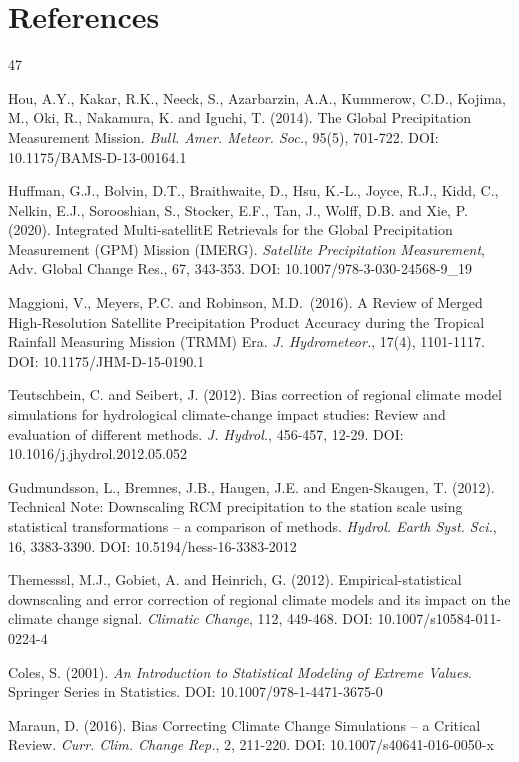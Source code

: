 \documentclass[
]{article}
\begin{document}
\section*{References}
\begin{thebibliography}{47}

 Hou, A.Y., Kakar, R.K., Neeck, S., Azarbarzin, A.A., Kummerow,
C.D., Kojima, M., Oki, R., Nakamura, K. and Iguchi, T. (2014). The
Global Precipitation Measurement Mission. \emph{Bull. Amer. Meteor.
Soc.}, 95(5), 701-722. DOI: 10.1175/BAMS-D-13-00164.1

 Huffman, G.J., Bolvin, D.T., Braithwaite, D., Hsu, K.-L., Joyce,
R.J., Kidd, C., Nelkin, E.J., Sorooshian, S., Stocker, E.F., Tan, J.,
Wolff, D.B. and Xie, P. (2020). Integrated Multi-satellitE Retrievals
for the Global Precipitation Measurement (GPM) Mission (IMERG).
\emph{Satellite Precipitation Measurement}, Adv. Global Change Res., 67,
343-353. DOI: 10.1007/978-3-030-24568-9\_19

 Maggioni, V., Meyers, P.C. and Robinson, M.D.~(2016). A Review
of Merged High-Resolution Satellite Precipitation Product Accuracy
during the Tropical Rainfall Measuring Mission (TRMM) Era. \emph{J.
Hydrometeor.}, 17(4), 1101-1117. DOI: 10.1175/JHM-D-15-0190.1

 Teutschbein, C. and Seibert, J. (2012). Bias correction of
regional climate model simulations for hydrological climate-change
impact studies: Review and evaluation of different methods. \emph{J.
Hydrol.}, 456-457, 12-29. DOI: 10.1016/j.jhydrol.2012.05.052

 Gudmundsson, L., Bremnes, J.B., Haugen, J.E. and Engen-Skaugen,
T. (2012). Technical Note: Downscaling RCM precipitation to the station
scale using statistical transformations -- a comparison of methods.
\emph{Hydrol. Earth Syst. Sci.}, 16, 3383-3390. DOI:
10.5194/hess-16-3383-2012

 Themesssl, M.J., Gobiet, A. and Heinrich, G. (2012).
Empirical-statistical downscaling and error correction of regional
climate models and its impact on the climate change signal.
\emph{Climatic Change}, 112, 449-468. DOI: 10.1007/s10584-011-0224-4

 Coles, S. (2001). \emph{An Introduction to Statistical Modeling
of Extreme Values}. Springer Series in Statistics. DOI:
10.1007/978-1-4471-3675-0

 Maraun, D. (2016). Bias Correcting Climate Change Simulations --
a Critical Review. \emph{Curr. Clim. Change Rep.}, 2, 211-220. DOI:
10.1007/s40641-016-0050-x


\end{thebibliography}
\end{document}
